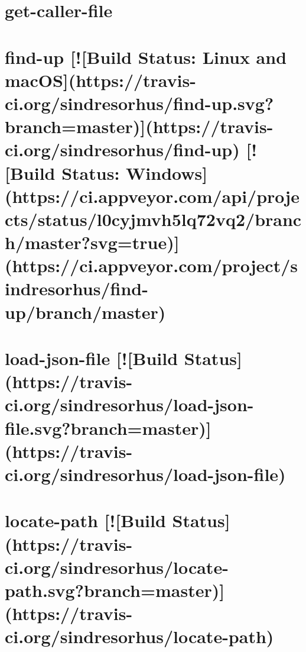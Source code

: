 \documentclass[twoside]{book}
\newcommand{\+}{\discretionary{\mbox{\scriptsize$\hookleftarrow$}}{}{}}
\begin{document}
\chapter{get-\/caller-\/file}
\label{md_dsmacc_examples_DRmerge_node_modules_get-caller-file_README}

\chapter{find-\/up \mbox{[}!\mbox{[}Build Status\+: Linux and mac\+OS\mbox{]}(https\+://travis-\/ci.org/sindresorhus/find-\/up.svg?branch=master)\mbox{]}(https\+://travis-\/ci.org/sindresorhus/find-\/up) \mbox{[}!\mbox{[}Build Status\+: Windows\mbox{]}(https\+://ci.appveyor.\+com/api/projects/status/l0cyjmvh5lq72vq2/branch/master?svg=true)\mbox{]}(https\+://ci.appveyor.\+com/project/sindresorhus/find-\/up/branch/master)}
\label{md_dsmacc_examples_DRmerge_node_modules_get-package-info_node_modules_find-up_readme}

\chapter{load-\/json-\/file \mbox{[}!\mbox{[}Build Status\mbox{]}(https\+://travis-\/ci.org/sindresorhus/load-\/json-\/file.svg?branch=master)\mbox{]}(https\+://travis-\/ci.org/sindresorhus/load-\/json-\/file)}
\label{md_dsmacc_examples_DRmerge_node_modules_get-package-info_node_modules_load-json-file_readme}

\chapter{locate-\/path \mbox{[}!\mbox{[}Build Status\mbox{]}(https\+://travis-\/ci.org/sindresorhus/locate-\/path.svg?branch=master)\mbox{]}(https\+://travis-\/ci.org/sindresorhus/locate-\/path)}
\label{md_dsmacc_examples_DRmerge_node_modules_get-package-info_node_modules_locate-path_readme}

\end{document}

